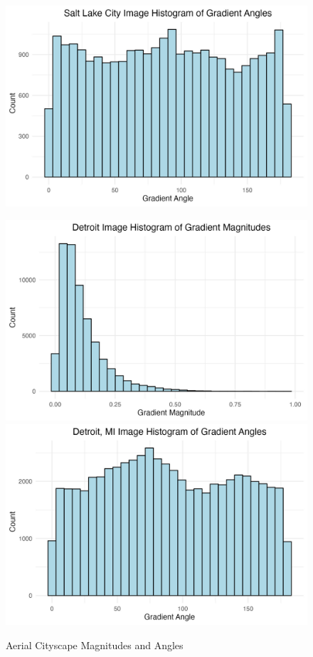 \documentclass[
  letterpaper,
  DIV=11,
  numbers=noendperiod]{scrreprt}
\begin{document}
\begin{figure}
\begin{minipage}{0.33\linewidth}
\includegraphics{images/plots/aerial_cities/salt_lake_histogram_theta_plot.jpg}\end{minipage}%
%
\begin{minipage}{0.33\linewidth}
\includegraphics{images/plots/aerial_cities/detroit_histogram_mag_plot.jpg}
\includegraphics{images/plots/aerial_cities/detroit_histogram_theta_plot.jpg}\end{minipage}%

\caption{\label{fig-city-histograms}Aerial Cityscape Magnitudes and
Angles}

\end{figure}%
\end{document}
